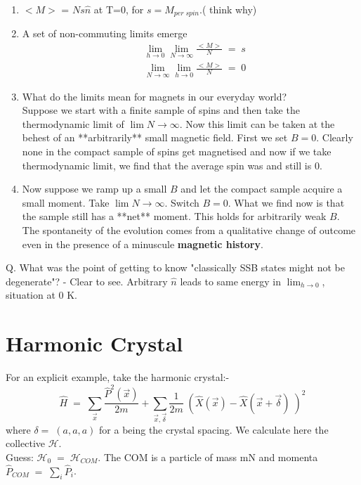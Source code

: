 \documentclass[12pt]{article}
\begin{document}
\begin{enumerate}
    \item  $<M>$ = $Ns\hat{n}$ at T=0, for $s= M_{per\;spin}$.( think why)
    \item  A set of non-commuting limits emerge
        \begin{align*}
              &\lim_{h\to 0}\lim_{N\to \infty} \frac{<M>}{N}\;=\;s\\
              &\lim_{N\to \infty}\lim_{h\to 0} \frac{<M>}{N}\;=\;0
        \end{align*}
    \item What do the limits mean for magnets in our everyday world? \\
    Suppose we start with a finite sample of spins and then take the thermodynamic limit of $\lim{N\to\infty}$. Now this limit can be taken at the behest of an **arbitrarily** small magnetic field. First we set $B=0$. Clearly none in the compact sample of spins get magnetised and now if we take thermodynamic limit, we find that the average spin was and still is 0.
    \item Now suppose we ramp up a small $B$ and let the compact sample acquire a small moment. Take $\lim{N\to\infty}$. Switch $B=0$. What we find now is that the sample still has a **net** moment. This holds for arbitrarily weak $B$. The spontaneity of the evolution comes from a qualitative change of outcome even in the presence of a minuscule \textbf{magnetic history}.
\end{enumerate}
Q. What was the point of getting to know "classically SSB states might not be degenerate"? - Clear to see.
Arbitrary
$\hat{n}$ leads to same energy in
$\lim_{h\to 0}$, situation at 0 K.

\section{Harmonic Crystal}
For an explicit example, take the harmonic crystal:-
\begin{equation*}
    \hat{H}\;=\;\sum_{\Vec{x}} \frac{\hat{P}^2(\vec{x})}{2m}+\sum_{\vec{x},\vec{\delta}}\frac{1}{2m}\;(\hat{X}(\vec{x})-\hat{X}(\vec{x}+\vec{\delta})\;)^2
\end{equation*}
where $\delta=\;(a,a,a)$ for a being the crystal spacing.
We calculate here the collective $\mathcal{H}$.\\
\newline
Guess: $\mathcal{H}_{0}\;=\;\mathcal{H}_{COM}$. The COM is a particle of mass mN and momenta $\hat{P}_{COM}\;=\;\sum_i \hat{P}_i$.\\
\end{document}
